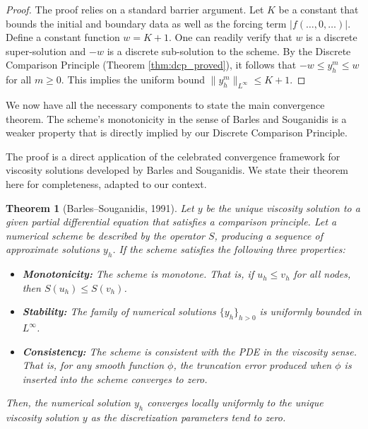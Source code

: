\documentclass[pdflatex,sn-mathphys-num]{sn-jnl}%
\theoremstyle{thmstyleone}%
\newtheorem{thm}{Theorem}[section]
\numberwithin{equation}{section}
\begin{document}
\begin{proof}
The proof relies on a standard barrier argument. Let $K$ be a constant that bounds the initial and boundary data as well as the forcing term $|f(\dots, 0, \dots)|$. Define a constant function $w = K + 1$. One can readily verify that $w$ is a discrete super-solution and $-w$ is a discrete sub-solution to the scheme. By the Discrete Comparison Principle (Theorem \ref{thm:dcp_proved}), it follows that $-w \le y_h^m \le w$ for all $m \ge 0$. This implies the uniform bound $\|y_h^m\|_{L^\infty} \le K+1$.
\end{proof}

We now have all the necessary components to state the main convergence theorem. The scheme's monotonicity in the sense of Barles and Souganidis is a weaker property that is directly implied by our Discrete Comparison Principle.

The proof is a direct application of the celebrated convergence framework for viscosity solutions developed by Barles and Souganidis. We state their theorem here for completeness, adapted to our context.

\begin{thm}[Barles--Souganidis, 1991]
\label{thm:barles_souganidis}
Let $y$ be the unique viscosity solution to a given partial differential equation that satisfies a comparison principle. Let a numerical scheme be described by the operator $S$, producing a sequence of approximate solutions $y_h$. If the scheme satisfies the following three properties:
\begin{itemize}
    \item[\textit{(i)}] \textbf{Monotonicity:} The scheme is monotone. That is, if $u_h \le v_h$ for all nodes, then $S(u_h) \le S(v_h)$.
    \item[\textit{(ii)}] \textbf{Stability:} The family of numerical solutions $\{y_h\}_{h>0}$ is uniformly bounded in $L^\infty$.
    \item[\textit{(iii)}] \textbf{Consistency:} The scheme is consistent with the PDE in the viscosity sense. That is, for any smooth function $\phi$, the truncation error produced when $\phi$ is inserted into the scheme converges to zero.
\end{itemize}
Then, the numerical solution $y_h$ converges locally uniformly to the unique viscosity solution $y$ as the discretization parameters tend to zero.
\end{thm}
\end{document}
